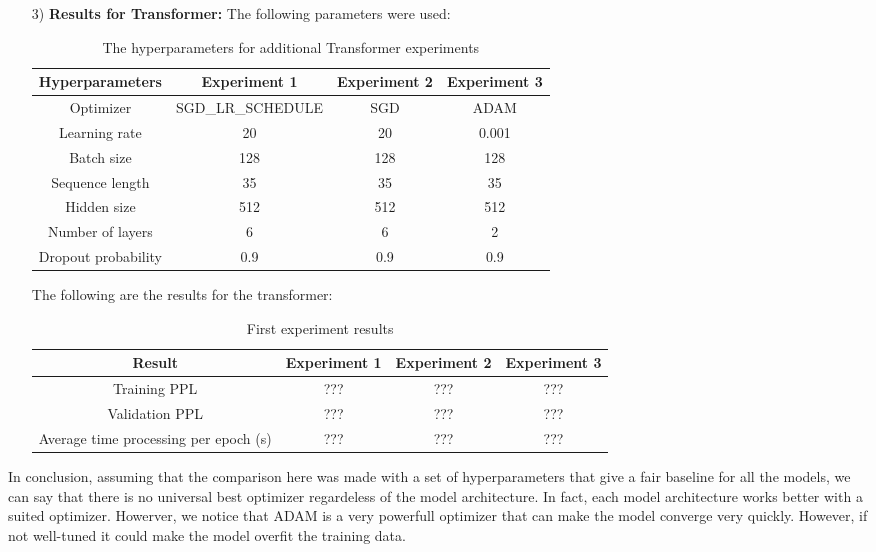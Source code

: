 \begin{itemize}
		\item[3)] \textbf{Results for Transformer:}
		The following parameters were used:
		\begin{table}[H]
			\centering
			\begin{tabular}{||c c c c||} 
				\hline
				\textbf{Hyperparameters} &\textbf{Experiment 1} & \textbf{Experiment 2} & \textbf{Experiment 3}\\[0.5ex] 
				\hline
				Optimizer & SGD\_LR\_SCHEDULE & SGD & ADAM\\
				Learning rate & 20 & 20 & 0.001  \\
				Batch size & 128 & 128 & 128 \\
				Sequence length & 35 & 35 & 35\\
				Hidden size & 512 & 512 & 512 \\
				Number of layers & 6 & 6 & 2 \\
				Dropout probability & 0.9 & 0.9 &0.9 \\[1ex]
				\hline
			\end{tabular}
			\caption{The hyperparameters for additional Transformer experiments}
			\label{table:5}
		\end{table}
The following are the results for the transformer:
\begin{table}[H]
	\centering
	\begin{tabular}{||c c c c||} 
		\hline
		\textbf{Result} & \textbf{Experiment 1} & \textbf{Experiment 2}& \textbf{Experiment 3} \\[0.5ex] 
		\hline
		Training PPL & ??? & ??? & ???  \\
		Validation PPL & ???  & ???  & ???  \\
		Average time processing per epoch (s) & ???  & ???  & ???  \\[1ex]
		\hline
	\end{tabular}
	\caption{First experiment results}
	\label{table:5.1}
\end{table}
\end{itemize}
%
In conclusion, assuming that the comparison here was made with a set of hyperparameters that give a fair baseline for all the models, we can say that there is no universal best optimizer regardeless of the model architecture. In fact, each model architecture works better with a suited optimizer. Howerver, we notice that ADAM is a very powerfull optimizer that can make the model converge very quickly. However, if not well-tuned it could make the model overfit the training data. \\


